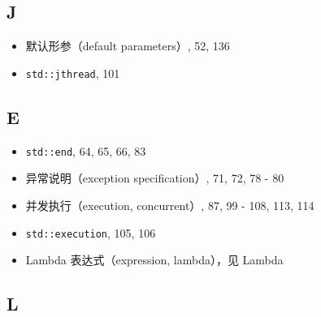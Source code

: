 \subsection{J}

\begin{itemize}
\item 默认形参（default parameters）, 52, 136
\item \texttt{std::jthread}, 101
\end{itemize}

\subsection{E}

\begin{itemize}
\item \texttt{std::end}, 64, 65, 66, 83
\item 异常说明（exception specification）, 71, 72, 78 - 80
\item 并发执行（execution, concurrent）, 87, 99 - 108, 113, 114
\item \texttt{std::execution}, 105, 106
\item Lambda 表达式（expression, lambda），见 Lambda
\end{itemize}

\subsection{L}

